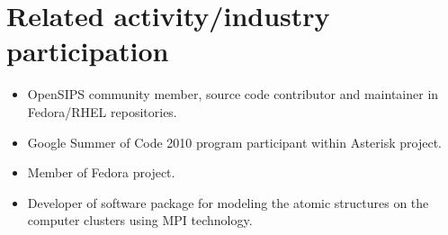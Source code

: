 \documentclass[a4paper,10pt]{article}
\begin{document}
\section{Related activity\slash industry participation}
\begin{itemize}
\item OpenSIPS community member, source code contributor and maintainer in
Fedora/RHEL repositories.
\item Google Summer of Code 2010 program participant within Asterisk project.
\item Member of Fedora project.
\item Developer of software package for modeling the atomic structures on the
computer clusters using MPI technology.
\end{itemize}
\end{document}
